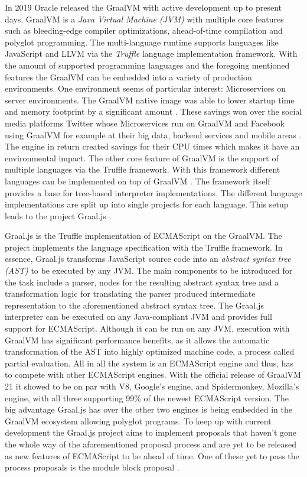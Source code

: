 In 2019 Oracle released the GraalVM \cite{graalVMStart} with active development up to present days. GraalVM  is a \emph{Java Virtual Machine (JVM)} with multiple core features such as bleeding-edge compiler optimizations, ahead-of-time compilation and polyglot programming. The multi-language runtime supports languages like JavaScript and LLVM via the \emph{Truffle} language implementation framework. With the amount of supported programming languages and the foregoing mentioned features the GraalVM can be embedded into a variety of production environments. One environment seems of particular interest: Microservices on server environments. The GraalVM native image was able to lower startup time and memory footprint by a significant amount \cite{graalVMNative}. These savings won over the social media platforms Twitter whose Microservices run on GraalVM \cite{graalTwitter} and Facebook using GraalVM for example at their big data, backend services and mobile areas \cite{facebook}. The engine in return created savings for their CPU times which makes it have an environmental impact. The other core feature of GraalVM is the support of multiple languages via the Truffle framework. With this framework different languages can be implemented on top of GraalVM \cite{graalVMIntro}. The framework itself provides a base for tree-based interpreter implementations. The different language implementations are split up into single projects for each language. This setup leads to the project Graal.js \cite{Graaljs}.

Graal.js \cite{Graaljs} is the Truffle implementation of ECMAScript on the GraalVM. The project implements the language specification with the Truffle framework. In essence, Graal.js transforms JavaScript source code into an \emph{abstract syntax tree (AST)} to be executed by any JVM. The main components to be introduced for the task include a parser, nodes for the resulting abstract syntax tree and a transformation logic for translating the parser produced intermediate representation to the aforementioned abstract syntax tree. The Graal.js interpreter can be executed on any Java-compliant JVM and provides full support for ECMAScript. Although it can be run on any JVM, execution with GraalVM has significant performance benefits, as it allows the automatic transformation of the AST into highly optimized machine code, a process called partial evaluation. All in all the system is an ECMAScript engine and thus, has to compete with other ECMAScript engines. With the official release of GraalVM 21 it showed to be on par with V8, Google's engine, and Spidermonkey, Mozilla's engine, with all three supporting 99\% of the newest ECMAScript version\cite{kangax1}. The big advantage Graal.js has over the other two engines is being embedded in the GraalVM ecosystem allowing polyglot programs. To keep up with current development the Graal.js project aims to implement proposals that haven't gone the whole way of the aforementioned proposal process and are yet to be released as new features of ECMAScript to be ahead of time. One of these yet to pass the process proposals is the module block proposal \cite{gitMB}.

